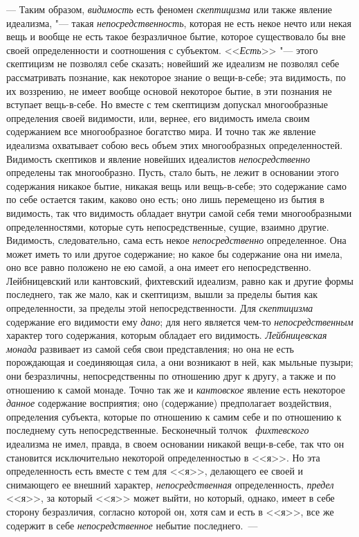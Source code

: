 --- Таким образом, {\em видимость} есть феномен
{\em скептицизма} или также явление идеализма, "--- такая
{\em непосредственность}, которая не есть некое нечто
или некая вещь и вообще не есть такое безразличное бытие, которое
существовало бы вне своей определенности и соотношения с субъектом.
<<{\em Есть}>> "--- этого скептицизм не позволял себе
сказать; новейший же идеализм не позволял себе рассматривать познание, как
некоторое знание о вещи-в-себе; эта видимость, по их воззрению, не имеет
вообще основой некоторое бытие, в эти познания не вступает вещь-в-себе. Но
вместе с тем скептицизм допускал многообразные определения своей видимости,
или, вернее, его видимость имела своим содержанием все многообразное
богатство мира. И точно так же явление идеализма охватывает собою весь
объем этих многообразных определенностей. Видимость скептиков и явление
новейших идеалистов {\em непосредственно} определены
так многообразно. Пусть, стало быть, не лежит в основании этого содержания
никакое бытие, никакая вещь или вещь-в-себе; это содержание само по себе
остается таким, каково оно есть; оно лишь перемещено из бытия в видимость,
так что видимость обладает внутри самой себя теми многообразными
определенностями, которые суть непосредственные, сущие, взаимно другие.
Видимость, следовательно, сама есть некое
{\em непосредственно} определенное. Она может иметь то
или другое содержание; но какое бы содержание она ни имела, оно все равно
положено не ею самой, а она имеет его непосредственно. Лейбницевский или
кантовский, фихтевский идеализм, равно как и другие формы последнего, так
же мало, как и скептицизм, вышли за пределы бытия как определенности, за
пределы этой непосредственности. Для {\em скептицизма}
содержание его видимости ему {\em дано}; для него
является чем-то {\em непосредственным} характер того
содержания, которым обладает его видимость.
{\em Лейбницевская монада} развивает из самой себя свои
представления; но она не есть порождающая и соединяющая сила, а они
возникают в ней, как мыльные пузыри; они безразличны, непосредственны по
отношению друг к другу, а также и по отношению к самой монаде. Точно так же
и {\em кантовское} явление есть некоторое
{\em данное} содержание восприятия; оно (содержание)
предполагает воздействия, определения субъекта, которые по отношению к
самим себе и по отношению к последнему суть непосредственные. Бесконечный
толчок~
{\em фихтевского} идеализма не имел, правда, в своем
основании никакой вещи-в-себе, так что он становится исключительно
некоторой определенностью в <<я>>. Но эта определенность есть вместе с тем
для <<я>>, делающего ее своей и снимающего ее внешний характер,
{\em непосредственная} определенность,
{\em предел} <<я>>, за который <<я>> может выйти, но
который, однако, имеет в себе сторону безразличия, согласно которой он,
хотя сам и есть в <<я>>, все же содержит в себе
{\em непосредственное} небытие последнего.~---


